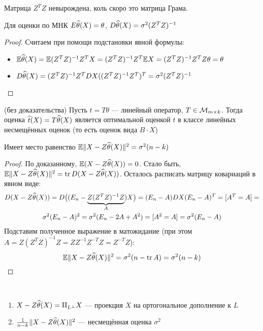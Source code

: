 \begin{note}
	Матрица $Z^TZ$ невырождена, коль скоро это матрица Грама.
\end{note}

\begin{proposition}
	Для оценки по МНК $E \widehat{\theta}(X) = \theta$, $D \widehat{\theta}(X) = \sigma^2(Z^TZ)^{-1}$
\end{proposition}

\begin{proof}
	Считаем при помощи подстановки явной формулы:
	\begin{itemize}
		\item $\mathbb{E} \widehat{\theta}(X) = \mathbb{E} (Z^TZ)^{-1}Z^TX = (Z^TZ)^{-1}Z^T\mathbb{E} X = (Z^TZ)^{-1}Z^TZ\theta = \theta$
		
		\item $D \widehat{\theta}(X) = (Z^TZ)^{-1}Z^T DX ((Z^TZ)^{-1}Z^T)^T = \sigma^2(Z^TZ)^{-1}$
	\end{itemize}
\end{proof}

\begin{theorem} (без доказательства)
	Пусть $t = T\theta$ --- линейный оператор, $T \in \mathcal{M}_{m \times k}$. Тогда оценка $\widehat{t}(X) = T\widehat{\theta}(X)$ является оптимальной оценкой $t$ в классе линейных несмещённых оценок (то есть оценок вида $B \cdot X$)
\end{theorem}

\begin{lemma}
	Имеет место равенство $\mathbb{E} \|X - Z\widehat{\theta}(X)\|^2 = \sigma^2(n - k)$
\end{lemma}

\begin{proof}
	По доказанному, $\mathbb{E} (X - Z\widehat{\theta}(X)) = 0$. Стало быть, $\mathbb{E} \|X - Z\widehat{\theta}(X)\|^2 = \operatorname{tr} D(X - Z\widehat{\theta}(X))$. Осталось расписать матрицу ковариаций в явном виде:
	\begin{multline*}
		D(X - Z\widehat{\theta}(X)) = D\big((E_n - \underbrace{Z(Z^TZ)^{-1}Z}_{A})X\big) = (E_n - A) DX (E_n - A)^T = [A^T = A] =
		\\
		\sigma^2 (E_n - A)^2 = \sigma^2(E_n - 2A + A^2) = [A^2 = A] = \sigma^2(E_n - A)
	\end{multline*}
	Подставим полученное выражение в матожидание (при этом \\ $A = Z(Z^TZ)^{-1}Z = ZZ^{-1}Z^{-T}Z = Z^{-T}Z$):
	\[
		\mathbb{E} \|X - Z\widehat{\theta}(X)\|^2 = \sigma^2(n - \operatorname{tr} A) = \sigma^2(n - k)
	\]
\end{proof}

\begin{corollary}~
	\begin{enumerate}
		\item $X - Z\widehat{\theta}(X) = \Pi_{L^\bot} X$ --- проекция $X$ на ортогональное дополнение к $L$
		
		\item $\frac{1}{n - k} \|X - Z\widehat{\theta}(X)\|^2$ --- несмещённая оценка $\sigma^2$
	\end{enumerate}
\end{corollary}

